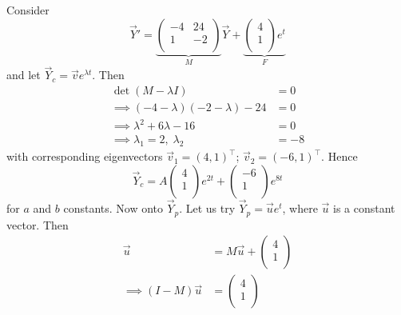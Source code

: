 \documentclass{../template/note}
\begin{document}
    \begin{example}
        Consider
        \[
            \vec Y' = \underbrace{\begin{pmatrix}
             -4 & 24 \\
             1 & -2 \\
            \end{pmatrix}}_M \vec Y + \underbrace{\begin{pmatrix}
             4 \\
             1 \\
            \end{pmatrix}e^t}_F
        \]
        and let \(\vec Y_c = \vec v e^{\lambda t}\). Then
        \begin{align*}
            \det(M - \lambda I) &= 0 \\
            \implies (-4-\lambda)(-2-\lambda)-24&=0 \\
            \implies \lambda^2 + 6\lambda - 16 &= 0 \\
            \implies \lambda_1 = 2, \; \lambda_2 &= -8
        \end{align*}
        with corresponding eigenvectors \(\vec v_1 = (4, 1)^\intercal\); \(\vec v_2 = (-6, 1)^\intercal\). Hence
        \[
            \vec Y_c = A \begin{pmatrix}
             4 \\
             1 \\
            \end{pmatrix} e^{2t} + \begin{pmatrix}
             -6 \\
             1 \\
            \end{pmatrix} e^{8t}
        \]
        for \(a\) and \(b\) constants. Now onto \(\vec Y_p\). Let us try \(\vec Y_p = \vec u e^t\), where \(\vec u\) is a constant vector. Then
        \begin{align*}
            \vec u &= M \vec u + \begin{pmatrix}
             4 \\
             1 \\
            \end{pmatrix} \\
            \implies (I-M) \vec u &= \begin{pmatrix}
             4 \\
             1 \\
            \end{pmatrix} \\

\end{align*}
\end{example}
\end{document}

